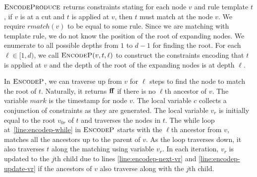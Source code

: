 $\textsc{EncodeProduce}$ returns constraints stating for each node $v$
and rule template $t$,
if $v$ is at a cut and $t$ is applied at $v$, then $t$ must match
at the node $v$.
We require $rmatch(v)$ to be equal to some rule.
Since we are matching with template rule, we do not know the
position of the root of expanding nodes.
We enumerate to all possible depths from $1$ to $d-1$ for finding
the root.
For each $\ell \in [1,d)$, we call $\textsc{EncodeP}( v, t, \ell)$
to construct the constraints encoding that $t$ is applied at $v$
and the depth of the root of the expanding nodes is at depth $\ell$.

In $\textsc{EncodeP}$, we can traverse up from $v$ for $\ell$ steps to
find the node to match the root of $t$.
Naturally, it returns $\mathbf{ff}$ if there
is no $\ell$th ancestor of $v$. %
The variable $mark$ is the timestamp for node $v$.
The local variable $c$ collects a conjunction of constraints as they are
generated. %
The local variable $v_r$ is initially equal to the root $v_{0r}$ of $t$
and traverses the nodes in $t$.
The while loop at~\ref{line:encodep-while} in $\textsc{EncodeP}$ starts with
the $\ell$th ancestor from $v$,
matches all the ancestors up to the parent of $v$.
As the loop traverses down, it also traverses $t$ along the matching
using variable $v_r$.
In each iteration, $v_r$ is updated to the $j$th child due to lines
\ref{line:encodep-next-vr} and \ref{line:encodep-update-vr}
if the ancestors of $v$ also traverse along with the $j$th child.

